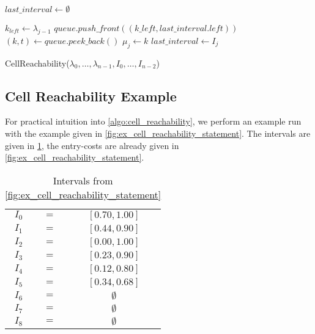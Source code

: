 \begin{algorithm}[htb]
  \DontPrintSemicolon
  \BlankLine
	\(last\_interval \gets \emptyset\) \;
	 {

		\(k_{left} \gets \lambda_{j-1}\)\;
		\(queue.push\_front((k\_left, last\_interval.left))\) \;
		\((k, t) \gets queue.peek\_back()\) \;
		\(\mu_j \gets k\) \;
		\(last\_interval \gets I_j\)
	}
	\caption{CellReachability(\(\lambda_0, \dots, \lambda_{n-1}, I_0, \dots, I_{n-2}\))}
  \label{algo:cell_reachability}
\end{algorithm}

\subsection{Cell Reachability Example}
\label{ssec:cell_reachability_ex}

For practical intuition into \cref{algo:cell_reachability}, we perform an example run with the example given in \cref{fig:ex_cell_reachability_statement}. The intervals are given in \cref{tab:cell_reachability_intervals}, the entry-costs are already given in \cref{fig:ex_cell_reachability_statement}.

\begin{table}[htb]
  \centering
	\begin{tabular}{|ccc|}
		\hline
		\(I_0\) & \(=\) & \([0.70, 1.00]\) \\
		\(I_1\) & \(=\) & \([0.44, 0.90]\) \\
		\(I_2\) & \(=\) & \([0.00, 1.00]\) \\
		\(I_3\) & \(=\) & \([0.23, 0.90]\) \\
		\(I_4\) & \(=\) & \([0.12, 0.80]\) \\
		\(I_5\) & \(=\) & \([0.34, 0.68]\) \\
		\(I_6\) & \(=\) & \(\emptyset\) \\ 
		\(I_7\) & \(=\) & \(\emptyset\) \\
		\(I_8\) & \(=\) & \(\emptyset\) \\
		\hline
	\end{tabular}
	\caption{Intervals from \cref{fig:ex_cell_reachability_statement}}
	\label{tab:cell_reachability_intervals}
\end{table}

